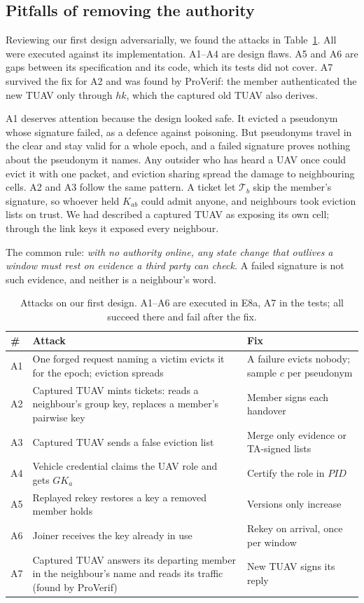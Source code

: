 \documentclass[conference]{IEEEtran}
\newcommand{\PID}{\mathit{PID}}
\newcommand{\GK}{\mathit{GK}}
\begin{document}
\subsection{Pitfalls of removing the authority}\label{sec:contain}
Reviewing our first design adversarially, we found the attacks in Table~\ref{tab:attacks}. All were executed against its implementation. A1--A4 are design flaws. A5 and A6 are
gaps between its specification and its code, which its tests did not cover. A7 survived the fix for A2 and was found by ProVerif: the member authenticated the new TUAV only
through $hk$, which the captured old TUAV also derives.

A1 deserves attention because the design looked safe. It evicted a pseudonym whose signature failed, as a defence against poisoning. But pseudonyms travel in the clear and stay
valid for a whole epoch, and a failed signature proves nothing about the pseudonym it names. Any outsider who has heard a UAV once could evict it with one packet, and eviction
sharing spread the damage to neighbouring cells. A2 and A3 follow the same pattern. A ticket let $\mathcal T_b$ skip the member's signature, so whoever held $K_{ab}$ could
admit anyone, and neighbours took eviction lists on trust. We had described a captured TUAV as exposing its own cell; through the link keys it exposed every neighbour.

The common rule: \emph{with no authority online, any state change that outlives a window must rest on evidence a third party can check.} A failed signature is not such evidence, and
neither is a neighbour's word.

\begin{table}[t]
\centering\scriptsize
\caption{Attacks on our first design. A1--A6 are executed in E8a, A7 in the tests; all succeed there and fail after the fix.}
\label{tab:attacks}
\begin{tabular}{@{}lp{3.55cm}p{3.0cm}@{}}
\toprule
\# & Attack & Fix\\
\midrule
A1 & One forged request naming a victim evicts it for the epoch; eviction spreads & A failure evicts nobody; sample $c$ per pseudonym\\
A2 & Captured TUAV mints tickets: reads a neighbour's group key, replaces a member's pairwise key & Member signs each handover\\
A3 & Captured TUAV sends a false eviction list & Merge only evidence or TA-signed lists\\
A4 & Vehicle credential claims the UAV role and gets $\GK_a$ & Certify the role in $\PID$\\
A5 & Replayed rekey restores a key a removed member holds & Versions only increase\\
A6 & Joiner receives the key already in use & Rekey on arrival, once per window\\
A7 & Captured TUAV answers its departing member in the neighbour's name and reads its traffic (found by ProVerif) & New TUAV signs its reply\\
\bottomrule
\end{tabular}
\end{table}
\end{document}
